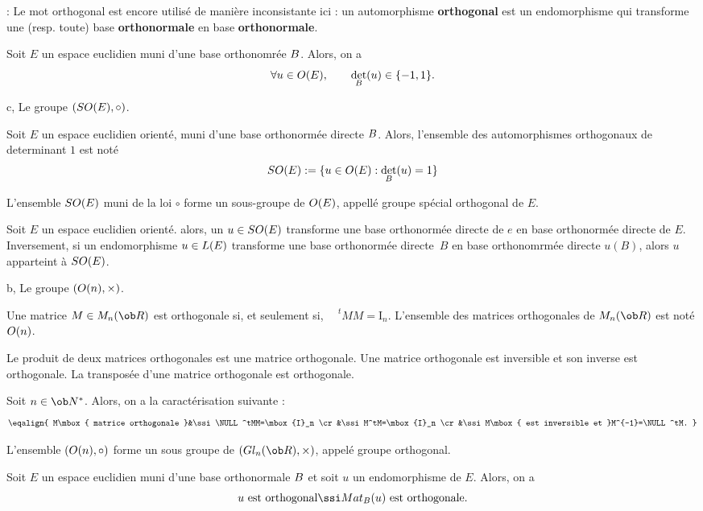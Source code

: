  \Remarque :  Le mot orthogonal est encore utilis\'e de mani\`ere inconsistante ici : un automorphisme {\bf orthogonal} est un endomorphisme qui transforme une (resp. toute) base {\bf orthonormale} en base {\bf orthonormale}. 
\bigskip

\Propriete []  Soit $E$ un espace euclidien muni d'une base orthonomr\'ee $\sc B$. Alors, on a 
$$
\forall u\in\sc O(E), \qquad \det_{\sc B}(u)\in\{-1,1\}. 
$$

\Subsection c, Le groupe $(\sc{SO}(E),\circ)$. 

\Definition []  Soit $E$ un espace euclidien orient\'e, muni d'une base orthonorm\'ee directe $\sc B$. 
Alors, l'ensemble des automorphismes orthogonaux de determinant $1$ est not\'e 
$$
\sc{SO}(E):=\{u\in\sc O(E):\det_{\sc B}(u)=1\}
$$

\Propriete []  L'ensemble $\sc{SO}(E)$ muni de la loi $\circ$ forme un sous-groupe de $\sc O(E)$, 
appell\'e groupe sp\'ecial orthogonal de $E$. 
\bigskip

\Propriete []  Soit $E$ un espace euclidien orient\'e. alors, un $u\in\sc{SO}(E)$ transforme 
une base orthonorm\'ee directe de $e$ en base orthonorm\'ee directe de $E$. \medskip
\noindent
Inversement, si un endomorphisme $u\in\sc L(E)$ transforme une base orthonorm\'ee directe~$B$ en base orthonomrm\'ee directe $u(B)$, 
alors $u$ apparteint \`a $\sc{SO}(E)$. 
\bigskip

\Subsection b, Le groupe $(\sc O(n),\times)$. 


\Definition []  Une matrice $M\in\sc M_n(\ob R)$ est orthogonale si, et seulement si, $\phantom{\!\!\!\!\!\!M}^tMM=\mbox{I}_n$. \pn
L'ensemble des matrices orthogonales de $\sc M_n(\ob R)$ est not\'e $\sc O(n)$. 
\bigskip

\Propriete []  Le produit de deux matrices orthogonales est une matrice orthogonale. \pn
Une matrice orthogonale est inversible et son inverse est orthogonale. \pn
La transpos\'ee d'une matrice orthogonale est orthogonale. 
\bigskip

\Propriete []  Soit $n\in\ob N^*$. Alors, on a la caract\'erisation suivante : 
$$
\eqalign{
M\mbox{ matrice orthogonale }&\ssi \NULL^tMM=\mbox{I}_n
\cr
&\ssi M^tM=\mbox{I}_n
\cr
&\ssi M\mbox{ est inversible et }M^{-1}=\NULL^tM.
}
$$

\Propriete []  L'ensemble $(\sc O(n),\circ)$ forme un sous groupe de $(\sc Gl_n(\ob R),\times)$, appel\'e groupe orthogonal. 
\bigskip

\Propriete []  Soit $E$ un espace euclidien muni d'une base orthonormale $\sc B$ et soit $u$ un endomorphisme de $E$. Alors, on a 
$$
u\mbox{ est orthogonal}\ssi\sc Mat_{\sc B}(u)\mbox{ est orthogonale}.
$$

